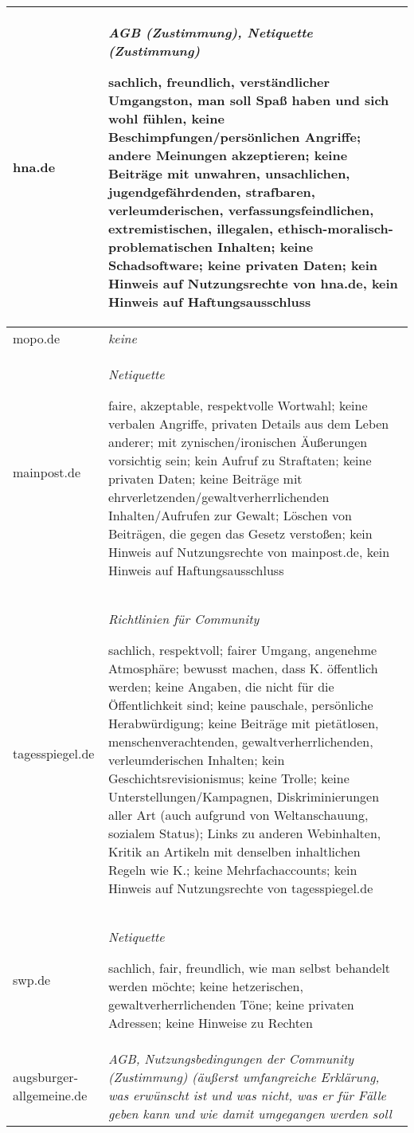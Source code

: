 \begin{landscape}
\begin{longtable}{lp{170mm}}
hna.de & \emph{AGB (Zustimmung), Netiquette (Zustimmung)}

	sachlich, freundlich, verständlicher Umgangston, man soll Spaß haben und
	sich wohl fühlen, keine Beschimpfungen/persönlichen Angriffe; andere
	Meinungen akzeptieren; keine Beiträge mit
	un\-wah\-ren, un\-sach\-li\-chen, ju\-gend\-ge\-fähr\-den\-den, straf\-ba\-ren, ver\-leum\-de\-ri\-schen, ver\-fas\-sungs\-feind\-li\-chen, ex\-tre\-mis\-ti\-schen, il\-le\-ga\-len, ethisch-mo\-ra\-lisch-pro\-ble\-ma\-ti\-schen
	Inhalten; keine Schadsoftware; keine privaten Daten; kein Hinweis auf
	Nutzungsrechte von hna.de, kein Hinweis auf
	Haftungsausschluss\tabularnewline\midrule

mopo.de &  \emph{keine}\tabularnewline\midrule

mainpost.de& \emph{Netiquette}

	faire, akzeptable, respektvolle Wortwahl; keine verbalen Angriffe,
	privaten Details aus dem Leben anderer; mit zynischen/ironischen
	Äußerungen vorsichtig sein; kein Aufruf zu Straftaten; keine privaten
	Daten; keine Beiträge mit ehrverletzenden/gewaltverherrlichenden
	Inhalten/Aufrufen zur Gewalt; Löschen von Beiträgen, die gegen das
	Gesetz verstoßen; kein Hinweis auf Nutzungsrechte von mainpost.de, kein
	Hinweis auf Haftungsausschluss\tabularnewline\midrule

tagesspiegel.de & \emph{Richtlinien für Community}

	sachlich, respektvoll; fairer Umgang, angenehme Atmosphäre; bewusst
	machen, dass K. öffentlich werden; keine Angaben, die nicht für die
	Öffentlichkeit sind; keine pauschale, persönliche Herabwürdigung; keine
	Beiträge mit
	pietätlosen, menschenverachtenden, gewaltverherrlichenden, verleumderischen
	Inhalten; kein Geschichtsrevisionismus; keine Trolle; keine
	Unterstellungen/Kampagnen, Diskriminierungen aller Art (auch aufgrund von
	Weltanschauung, sozialem Status); Links zu anderen Webinhalten, Kritik an
	Artikeln mit denselben inhaltlichen Regeln wie K.; keine
	Mehrfachaccounts; kein Hinweis auf Nutzungsrechte von
	tagesspiegel.de\tabularnewline\midrule

swp.de & \emph{Netiquette}

	sachlich, fair, freundlich, wie man selbst behandelt werden möchte;
	keine het\-ze\-ri\-schen, ge\-walt\-ver\-herr\-li\-chen\-den Töne; keine privaten Adressen;
	keine Hinweise zu Rechten\tabularnewline\midrule


augsburger-allgemeine.de & \emph{AGB, Nutzungsbedingungen der Community
  (Zustimmung) (äußerst umfangreiche Erklärung, was erwünscht ist und was nicht,
  was er für Fälle geben kann und wie damit umgegangen werden soll}


\end{longtable}
\end{landscape}
